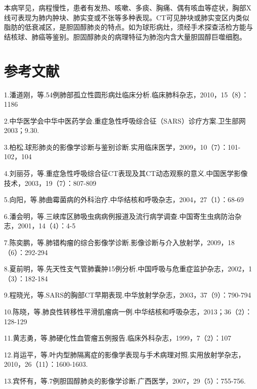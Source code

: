 本病罕见，病程慢性，患者有发热、咳嗽、多痰、胸痛、偶有咳血等症状，胸部X线可表现为肺内肿块、肺实变或不张等多种表现。CT可见肿块或肺实变区内类似脂肪的低衰减区，是胆固醇肺炎的特点。如为球形病灶，须经手术探查活检方能与结核球、肺癌等鉴别。胆固醇肺炎的病理特征为肺泡内含大量胆固醇巨噬细胞。

\protect\hypertarget{text00091.html}{}{}

\section{参考文献}

1.潘道刚，等.54例肺部孤立性圆形病灶临床分析.临床肺科杂志，2010，15（8）：1186

2.中华医学会中华中医药学会.重症急性呼吸综合征（SARS）诊疗方案.卫生部网2003；9.30.

3.柏松.球形肺炎的影像学诊断与鉴别诊断.实用临床医学，2009，10（7）：101-102，104

4.刘丽芬，等.重症急性呼吸综合征CT表现及其CT动态观察的意义.中国医学影像技术，2003，19（7）：807-809

5.向阳，等.肺曲霉菌病的外科治疗.中华结核和呼吸杂志，2004，27（1）：68-69

6.潘会明，等.三峡库区肺吸虫病病例报道及流行病学调查.中国寄生虫病防治杂志，2001，14（4）：4-5

7.陈奕鹏，等.肺错构瘤的综合影像学诊断.影像诊断与介入放射学，2009，18（6）：292-294

8.夏前明，等.先天性支气管肺囊肿15例分析.中国呼吸与危重症监护杂志，2002，1（3）：182-184

9.程晓光，等.SARS的胸部CT早期表现.中华放射学杂志，2003，37（9）：790-794

10.陈晓，等.肺良性转移性平滑肌瘤病一例.中华结核和呼吸杂志，2013；36（2）：128-129

11.黄志勇，等.肺硬化性血管瘤五例报告.临床外科杂志，1999，7（2）：107

12.肖运平，等.叶内型肺隔离症的影像学表现与手术病理对照.实用放射学杂志，2010，26（11）：1600-1603.

13.宾怀有，等.7例胆固醇肺炎的影像学诊断.广西医学，2007，29（5）：755-756.

\protect\hypertarget{text00092.html}{}{}

